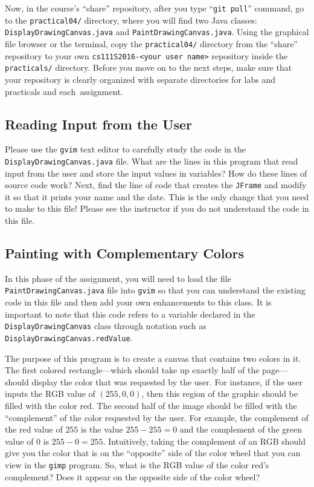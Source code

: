 Now, in the course's ``share'' repository, after you type ``{\tt git pull}'' command, go to the {\tt practical04/}
directory, where you will find two Java classes: {\tt DisplayDrawingCanvas.java} and {\tt PaintDrawingCanvas.java}.
Using the graphical file browser or the terminal, copy the {\tt practical04/} directory from the ``share''
repository to your own {\tt cs111S2016-<your user name>} repository inside the {\tt practicals/} directory. Before you
move on to the next steps, make sure that your repository is clearly organized with separate directories for labs and
practicals and \mbox{each assignment}.

\vspace*{-.1in}
\subsection*{Reading Input from the User}

Please use the {\tt gvim} text editor to carefully study the code in the {\tt DisplayDrawingCanvas.java} file. What are
the lines in this program that read input from the user and store the input values in variables? How do these lines of
source code work? Next, find the line of code that creates the {\tt JFrame} and modify it so that it prints your name
and the date. This is the only change that you need to make to this file! Please see the instructor if you do not
understand the code in this file.

\vspace*{-.2in}
\subsection*{Painting with Complementary Colors}

In this phase of the assignment, you will need to load the file {\tt PaintDrawingCanvas.java} file into {\tt gvim} so
that you can understand the existing code in this file and then add your own enhancements to this class. It is important
to note that this code refers to a variable declared in the {\tt DisplayDrawingCanvas} class through notation such as
{\tt DisplayDrawingCanvas.redValue}.

The purpose of this program is to create a canvas that contains two colors in it. The first colored rectangle---which
should take up exactly half of the page---should display the color that was requested by the user. For instance, if the
user inputs the RGB value of $(255,0,0)$, then this region of the graphic should be filled with the color red. The
second half of the image should be filled with the ``complement'' of the color requested by the user. For example, the
complement of the red value of $255$ is the value $255-255=0$ and the complement of the green value of $0$ is
$255-0=255$. Intuitively, taking the complement of an RGB should give you the color that is on the ``opposite'' side of
the color wheel that you can view in the {\tt gimp} program. So, what is the RGB value of the color red's complement?
Does it appear on the opposite side of the color wheel?

